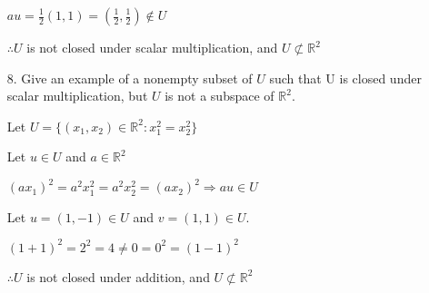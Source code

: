 \documentclass{article}
\begin{document}
\begin{enumerate}[nolistsep]
		$au = \frac{1}{2}(1, 1) = (\frac{1}{2}, \frac{1}{2}) \not\in U$
		
		$\therefore U$ is not closed under scalar multiplication, and $U \not\subset \mathbb{R}^2$
		
		\item[8.] Give an example of a nonempty subset of $U$ such that U is closed under scalar multiplication, but $U$ is not a subspace of $\mathbb{R}^2$.
		
		Let $U = \{(x_1, x_2) \in \mathbb{R}^2 : x_1^2 = x_2^2\}$
		
		Let $u \in U$ and $a \in \mathbb{R}^2$
		
		$(ax_1)^2 = a^2x_1^2 = a^2x_2^2 = (ax_2)^2 \Rightarrow au \in U$
		
		Let $u = (1, -1) \in U$ and $v = (1, 1) \in U$.
		
		$(1 + 1)^2 = 2^2 = 4 \neq 0 = 0^2 = (1 - 1)^2$
		
		$\therefore U$ is not closed under addition, and $U \not\subset \mathbb{R}^2$
	\end{enumerate}
\end{document}
